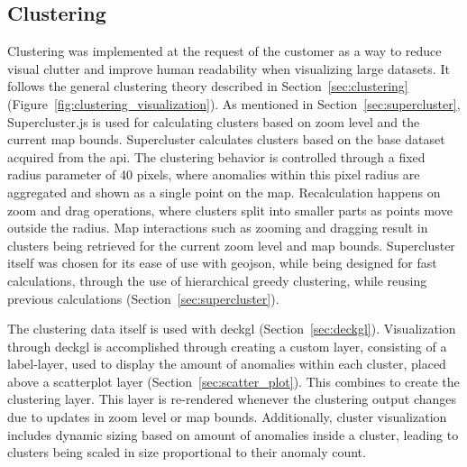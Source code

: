 
\subsection{Clustering}
\label{sec:clustering_method}

Clustering was implemented at the request of the customer as a way to reduce visual clutter and improve human readability when visualizing large datasets. It follows the general clustering theory described in Section~\ref{sec:clustering} (Figure~\ref{fig:clustering_visualization}). As mentioned in Section~\ref{sec:supercluster}, Supercluster.js is used for calculating clusters based on zoom level and the current map bounds. Supercluster calculates clusters based on the base dataset acquired from the \acrshort{api}. The clustering behavior is controlled through a fixed radius parameter of 40 pixels, where anomalies within this pixel radius are aggregated and shown as a single point on the map. Recalculation happens on zoom and drag operations, where clusters split into smaller parts as points move outside the radius. Map interactions such as zooming and dragging result in clusters being retrieved for the current zoom level and map bounds. Supercluster itself was chosen for its ease of use with \acrshort{geojson}, while being designed for fast calculations, through the use of hierarchical greedy clustering, while reusing previous calculations (Section~\ref{sec:supercluster}). 

The clustering data itself is used with \gls{deckgl} (Section~\ref{sec:deckgl}). Visualization through \gls{deckgl} is accomplished through creating a custom layer, consisting of a label-layer, used to display the amount of anomalies within each cluster, placed above a scatterplot layer (Section~\ref{sec:scatter_plot}). This combines to create the clustering layer. This layer is re-rendered whenever the clustering output changes due to updates in zoom level or map bounds. Additionally, cluster visualization includes dynamic sizing based on amount of anomalies inside a cluster, leading to clusters being scaled in size proportional to their anomaly count.

